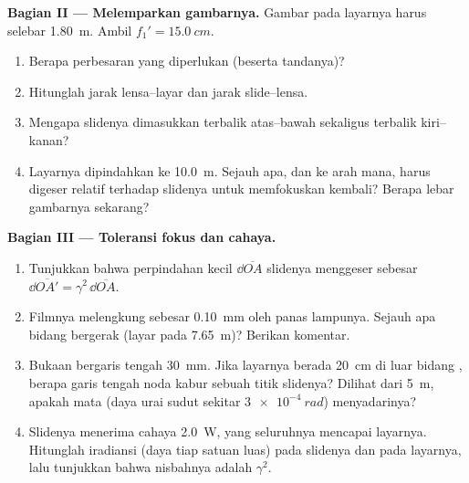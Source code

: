 \begin{problem}
\medskip
\noindent\textbf{Bagian II --- Melemparkan gambarnya.}
Gambar pada layarnya harus selebar \qty{1.80}{m}. Ambil
$f_1' = \qty{15.0}{cm}$.
\begin{enumerate}[resume]
  \item Berapa perbesaran yang diperlukan (beserta tandanya)?
  \item Hitunglah jarak lensa--layar dan jarak slide--lensa.
  \item Mengapa slidenya dimasukkan terbalik atas--bawah sekaligus
        terbalik kiri--kanan?
  \item Layarnya dipindahkan ke \qty{10.0}{m}. Sejauh apa, dan ke arah
        mana,  harus digeser relatif terhadap slidenya untuk
        memfokuskan kembali? Berapa lebar gambarnya sekarang?
\end{enumerate}

\medskip
\noindent\textbf{Bagian III --- Toleransi fokus dan cahaya.}
\begin{enumerate}[resume]
  \item Tunjukkan bahwa perpindahan kecil $\dd\overline{OA}$ slidenya
        menggeser  sebesar $\dd\overline{OA'} = \gamma^2\,\dd\overline{OA}$.
  \item Filmnya melengkung sebesar \qty{0.10}{mm} oleh panas lampunya.
        Sejauh apa bidang  bergerak (layar pada
        \qty{7.65}{m})? Berikan komentar.
  \item Bukaan  bergaris tengah \qty{30}{mm}. Jika layarnya
        berada \qty{20}{cm} di luar bidang , berapa garis
        tengah noda kabur sebuah titik slidenya? Dilihat dari
        \qty{5}{m}, apakah mata (daya urai sudut sekitar
        $\qty{3e-4}{rad}$) menyadarinya?
  \item Slidenya menerima cahaya \qty{2.0}{W}, yang seluruhnya mencapai
        layarnya. Hitunglah iradiansi (daya tiap satuan luas) pada
        slidenya dan pada layarnya, lalu tunjukkan bahwa nisbahnya
        adalah $\gamma^2$.
\end{enumerate}


\end{problem}
